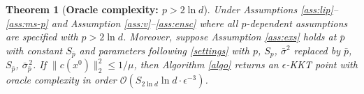 \documentclass[11pt]{article}
\newtheorem{theorem}{Theorem}[section]
\numberwithin{equation}{section}
\begin{document}
\begin{theorem}[\bf {Oracle} complexity:  {\(p>{2\ln d}\)}]\label{thm:pinf}
Under Assumptions \ref{ass:lip}--\ref{ass:ms-p} and Assumption \ref{ass:v}--\ref{ass:ensc} where all \(p\)-dependent assumptions are specified with  \(p > {2\ln d}\). Moreover, suppose Assumption \ref{ass:exs} holds at \(\bar p\) with constant \(S_{\bar p}\) and  parameters following  \eqref{settings} with \(p\), \(S_p\), \(\bar\sigma^2\) replaced by
\(\bar p\), \(S_{\bar p}\), 
\(\bar\sigma_{\bar p}^{\,2}\). If   \(\|c(x^0)\|_2^2\le1/\mu\), 
then Algorithm \ref{algo} returns an
\(\epsilon\)-KKT point with oracle complexity in order 
\(\mathcal{O}(S_{2\ln d}\ln d\cdot\epsilon^{-3})\).
\end{theorem}
\end{document}
